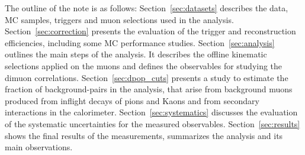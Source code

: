 The outline of the note is as follows:
Section~\ref{sec:datasets} describes the data, MC samples, triggers and 
  muon selections used in the analysis.
Section~\ref{sec:correction} presents the evaluation of the trigger 
  and reconstruction efficiencies, including some MC performance studies.
Section~\ref{sec:analysis} outlines the main steps of the analysis.
It describes the offline kinematic selections applied on the muons 
  and defines the observables for studying the dimuon correlations.
Section~\ref{sec:dpop_cuts} presents a study to estimate the fraction of
  background-pairs in the analysis, that arise from
  background muons produced from inflight decays of pions and Kaons
  and from secondary interactions in the calorimeter.
Section~\ref{sec:systematics} discusses the evaluation of the 
  systematic uncertainties for the measured observables.
Section~\ref{sec:results} shows the final results of the measurements, 
  summarizes the analysis and its main observations.

